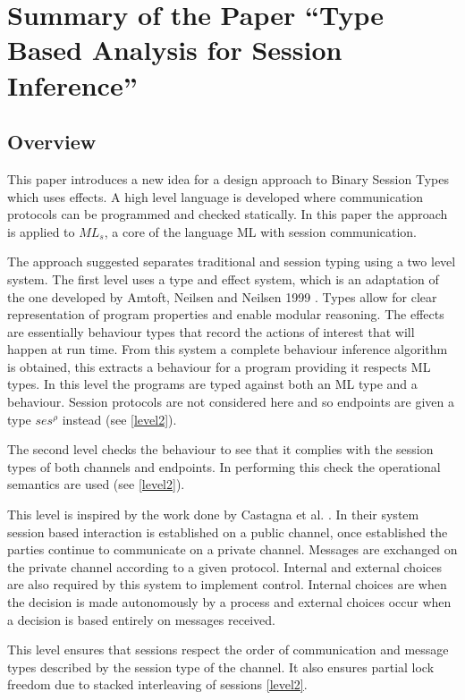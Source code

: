 \chapter{Summary of the Paper ``Type Based Analysis for Session Inference''}

\section{Overview} \label{overview}
This paper introduces a new idea for a design approach to Binary Session Types which uses effects. A high level language is developed where communication protocols can be programmed and checked statically. In this paper \cite{paper1} the approach is applied to $ML_s$, a core of the language ML with session communication.

The approach suggested separates traditional and session typing using a two level system. The first level uses a type and effect system, which is an adaptation of the one developed by Amtoft, Neilsen and Neilsen 1999 \cite{amtoft}. Types allow for clear representation of program properties and enable modular reasoning. The effects are essentially behaviour types that record the actions of interest that will happen at run time. From this system a complete behaviour inference algorithm is obtained, this extracts a behaviour for a program providing it respects ML types. In this level the programs are typed against both an ML type and a behaviour. Session protocols are not considered here and so endpoints are given a type $ses^\rho$ instead (see \ref{level2}).   

The second level checks the behaviour to see that it complies with the session types of both channels and endpoints. In performing this check the operational semantics are used (see \ref{level2}). 

This level is inspired by the work done by Castagna et al. \cite{foundSessTypes}. In their system session based interaction is established on a public channel, once established the parties continue to communicate on a private channel. Messages are exchanged on the private channel according to a given protocol. Internal and external choices are also required by this system to implement control. Internal choices are when the decision is made autonomously by a process and external choices occur when a decision is based entirely on messages received. 

This level ensures that sessions respect the order of communication and message types described by the session type of the channel. It also ensures partial lock freedom due to stacked interleaving of sessions \ref{level2}.

